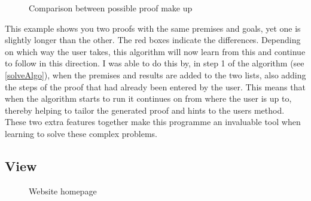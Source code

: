 \begin{figure}[!ht]
	\centering
	\caption{Comparison between possible proof make up}
\end{figure}

This example shows you two proofs with the same premises and goals, yet one is slightly longer than the other. The red boxes indicate the differences. Depending on which way the user takes, this algorithm will now learn from this and continue to follow in this direction. I was able to do this by, in step 1 of the algorithm (see \ref{solveAlgo}), when the premises and results are added to the two lists, also adding the steps of the proof that had already been entered by the user. This means that when the algorithm starts to run it continues on from where the user is up to, thereby helping to tailor the generated proof and hints to the users method. These two extra features together make this programme an invaluable tool when learning to solve these complex problems. 


\subsection{View}

\begin{figure}[!ht]
	\centering
	\caption{Website homepage}
\end{figure}

